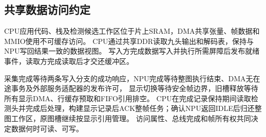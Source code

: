 \subsection{共享数据访问约定}

CPU应用代码、栈及检测候选工作区位于片上SRAM，DMA共享张量、帧数据和MMIO使用不可缓存访问。
CPU通过共享DDR读取九头输出和解码表，保持与NPU写回结果一致的数据视图。
写入方完成数据写入并执行所需屏障后发布就绪事件，读取方完成读取后才交还缓冲区。

采集完成等待两条写入分支的成功响应，NPU完成等待整图执行结束、DMA无在途事务及外部服务适配器的发布许可，
显示切换等待安全帧边界，旧槽释放等待所有显示DMA、行缓存预取和FIFO引用排空。
CPU在完成记录保持期间读取检测头并完成后处理，构建显示记录后ACK整帧任务；确认NPU返回IDLE后归还整图工作区，原图槽继续按显示引用管理。
访问属性、总线完成和帧所有权共同决定数据何时可读、可写。

